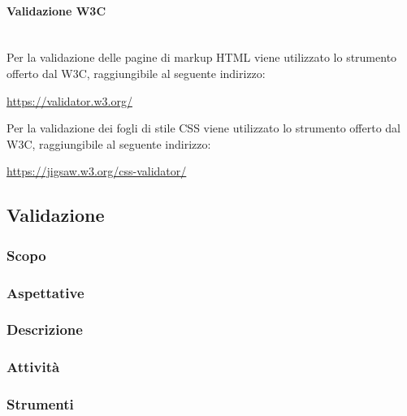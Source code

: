 		\paragraph{Validazione W3C} \mbox{}\\
		Per la validazione delle pagine di markup HTML viene utilizzato lo strumento offerto dal W3C, raggiungibile al seguente indirizzo: \newline
		\centerline{\url{https://validator.w3.org/}} \newline
		Per la validazione dei fogli di stile CSS viene utilizzato lo strumento offerto dal W3C, raggiungibile al seguente indirizzo: \newline
		\centerline{\url{https://jigsaw.w3.org/css-validator/}} \newline

	\subsection{Validazione}
	\subsubsection{Scopo}
	\subsubsection{Aspettative}
	\subsubsection{Descrizione}
	\subsubsection{Attività}
	\subsubsection{Strumenti}

	
